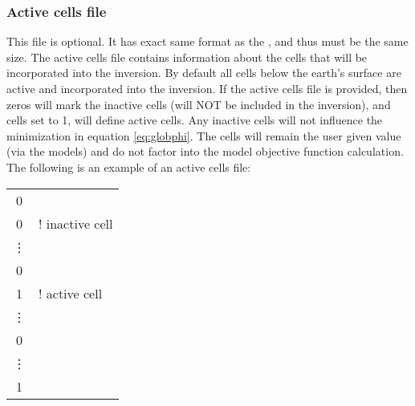 \subsubsection{Active cells file}
This file is optional. It has exact same format as the , and thus must be the same size. The active cells file contains information about the cells that will be incorporated into the inversion. By default all cells below the earth's surface are active and incorporated into the inversion. If the active cells file is provided, then zeros will mark the inactive cells (will NOT be included in the inversion), and cells set to 1, will define active cells. Any inactive cells will not influence the minimization in equation \ref{eq:globphi}. The cells will remain the user given value (via the  models) and do not factor into the model objective function calculation. The following is an example of an active cells file:
\begin{fileExample}
\begin{tabular}{|cl|}
\hline
0 & \\
0 & ! inactive cell\\
\vdots & \\
0 & \\
1 & ! active cell\\
\vdots & \\
0 & \\
\vdots & \\
1 & \\
\hline
\end{tabular}
\end{fileExample}